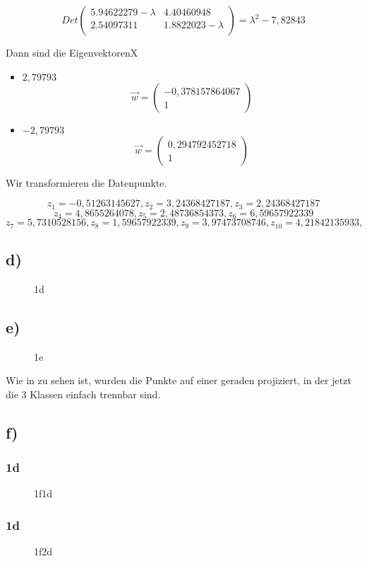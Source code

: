 \documentclass[a4paper,parskip=full-]{article}
\begin{document}
$$
Det\left(
\begin{array}{cc}
 5.94622279 - \lambda & 4.40460948 \\
 2.54097311           & 1.8822023 - \lambda \\
\end{array}
\right) = \lambda^2-7,82843
$$

Dann sind die EigenvektorenX

\begin{itemize}
\item $2,79793$
$$
\vec{w} = 
\begin{pmatrix} -0,378157864067 \\ 1 \end{pmatrix}
$$
\item $-2,79793$
$$
\vec{w} = 
\begin{pmatrix} 0,294792452718 \\ 1 \end{pmatrix}
$$
\end{itemize}

Wir transformieren die Datenpunkte.

$$
z_1
 = 
-0,51263145627, 
z_2
 = 
3,24368427187,
z_3 
 = 
2,24368427187 
$$
$$
z_4
 = 
4,8655264078,
z_5
 = 
2,48736854373,
z_6
 = 
6,59657922339 $$ $$
z_7
 = 
5,7310528156,
z_8
 = 
1,59657922339,
z_9
 = 
3,97473708746,
z_{10}
 = 
4,21842135933,
$$

\subsection{d)}

\begin{figure}[H]
    \def\svgwidth{\columnwidth}
	
	\label{fig:1d}
	\caption{1d}
\end{figure}

\subsection{e)}

\begin{figure}[H]
    \def\svgwidth{\columnwidth}
	
	\label{fig:1e}
	\caption{1e}
\end{figure}

Wie in zu sehen ist, wurden die Punkte auf einer geraden projiziert, in der jetzt die 3 Klassen einfach trennbar sind.

\subsection{f)}

\subsubsection{1d}

\begin{figure}[H]
    \def\svgwidth{\columnwidth}
	
	\label{fig:1f1d}
	\caption{1f1d}
\end{figure}

\subsubsection{1d}

\begin{figure}[H]
    \def\svgwidth{\columnwidth}
	
	\label{fig:1f2d}
	\caption{1f2d}
\end{figure}
\end{document}
